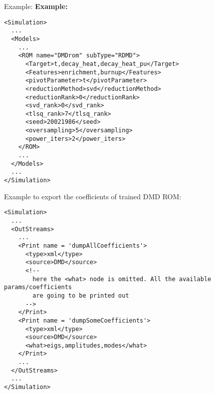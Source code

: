 \hspace{24pt}
Example:
\textbf{Example:}
\begin{lstlisting}[style=XML,morekeywords={name,subType}]
<Simulation>
  ...
  <Models>
    ...
    <ROM name="DMDrom" subType="RDMD">
      <Target>t,decay_heat,decay_heat_pu</Target>
      <Features>enrichment,burnup</Features>
      <pivotParameter>t</pivotParameter>
      <reductionMethod>svd</reductionMethod>
      <reductionRank>0</reductionRank>
      <svd_rank>0</svd_rank>
      <tlsq_rank>7</tlsq_rank>
      <seed>20021986</seed>
      <oversampling>5</oversampling>
      <power_iters>2</power_iters>
    </ROM>
    ...
  </Models>
  ...
</Simulation>
\end{lstlisting}

Example to export the coefficients of trained DMD ROM:
\begin{lstlisting}[style=XML,morekeywords={name,subType}]
<Simulation>
  ...
  <OutStreams>
    ...
    <Print name = 'dumpAllCoefficients'>
      <type>xml</type>
      <source>DMD</source>
      <!--
        here the <what> node is omitted. All the available params/coefficients
        are going to be printed out
      -->
    </Print>
    <Print name = 'dumpSomeCoefficients'>
      <type>xml</type>
      <source>DMD</source>
      <what>eigs,amplitudes,modes</what>
    </Print>
    ...
  </OutStreams>
  ...
</Simulation>
\end{lstlisting}


